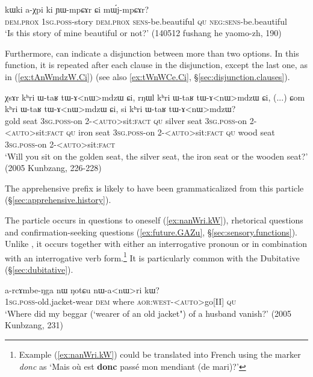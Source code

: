 \begin{exe}
\ex \label{ex:YWmpCAr.Ci}
\gll kɯki a-χpi ki ɲɯ-mpɕɤr ɕi mɯ́j-mpɕɤr? \\
\textsc{dem}.\textsc{prox} \textsc{1sg}.\textsc{poss}-story \textsc{dem}.\textsc{prox} \textsc{sens}-be.beautiful \textsc{qu} \textsc{neg}:\textsc{sens}-be.beautiful \\
\glt `Is this story of mine beautiful or not?' (140512 fushang he yaomo-zh, 190)
\end{exe}

Furthermore,  can indicate a disjunction between more than two options. In this function, it is repeated after each clause in the disjunction, except the last one, as in (\ref{ex:tAnWmdzW.Ci}) (see also \ref{ex:tWnWCe.Ci}, §\ref{sec:disjunction.clauses}).

\begin{exe}
\ex \label{ex:tAnWmdzW.Ci}
\gll  χsɤr kʰri ɯ-taʁ tɯ-ɤ<nɯ>mdzɯ ɕi, rŋɯl kʰri ɯ-taʁ tɯ-ɤ<nɯ>mdzɯ ɕi, (...) ɕom kʰri ɯ-taʁ tɯ-ɤ<nɯ>mdzɯ ɕi, si kʰri ɯ-taʁ tɯ-ɤ<nɯ>mdzɯ? \\
gold seat \textsc{3sg}.\textsc{poss}-on 2-<\textsc{auto}>sit:\textsc{fact}  \textsc{qu} silver seat \textsc{3sg}.\textsc{poss}-on 2-<\textsc{auto}>sit:\textsc{fact}  \textsc{qu}  {  } iron seat \textsc{3sg}.\textsc{poss}-on 2-<\textsc{auto}>sit:\textsc{fact}  \textsc{qu} wood seat \textsc{3sg}.\textsc{poss}-on 2-<\textsc{auto}>sit:\textsc{fact}  \\
\glt `Will you sit on the golden seat, the silver seat, the iron seat or the wooden seat?' (2005 Kunbzang, 226-228)
\end{exe}

The apprehensive prefix  is likely to have been grammaticalized from this particle (§\ref{sec:apprehensive.history}).

The particle  occurs in questions to oneself (\ref{ex:nanWri.kW}), rhetorical questions and confirmation-seeking questions  (\ref{ex:future.GAZu}, §\ref{sec:sensory.functions}). Unlike , it occurs together with either an interrogative pronoun or in combination with an interrogative verb form.\footnote{Example  (\ref{ex:nanWri.kW}) could be translated into French using the marker \textit{donc} as `Mais où est \textbf{donc} passé mon mendiant (de mari)?' } It is particularly common with the Dubitative (§\ref{sec:dubitative}).

\begin{exe}
\ex \label{ex:nanWri.kW}
\gll a-rcɤmbe-ŋga nɯ ŋotɕu nɯ-a<nɯ>ri kɯ? \\
\textsc{1sg}.\textsc{poss}-old.jacket-wear \textsc{dem} where \textsc{aor}:\textsc{west}-<\textsc{auto}>go[II] \textsc{qu} \\
\glt `Where did my beggar (`wearer of an old jacket") of a husband vanish?' (2005 Kunbzang, 231)
\end{exe}


